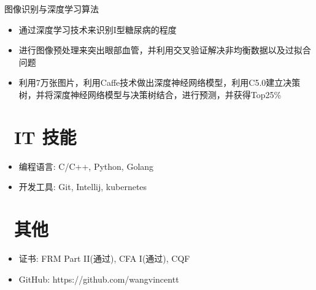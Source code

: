 \documentclass{resume}
\begin{document}
\begin{onehalfspacing}
图像识别与深度学习算法
\begin{itemize}
  \item 通过深度学习技术来识别I型糖尿病的程度
  \item 进行图像预处理来突出眼部血管，并利用交叉验证解决非均衡数据以及过拟合问题
  \item 利用7万张图片，利用Caffe技术做出深度神经网络模型，利用C5.0建立决策树，并将深度神经网络模型与决策树结合，进行预测，并获得Top25\%
\end{itemize}
\end{onehalfspacing}


\section{\faCogs\ IT 技能}
\begin{itemize}[parsep=0.5ex]
  \item 编程语言: C/C++, Python, Golang
  \item 开发工具: Git, Intellij, kubernetes
\end{itemize}

\section{\faInfo\ 其他}
\begin{itemize}[parsep=0.5ex]
  \item 证书: FRM Part II(通过), CFA I(通过), CQF
  \item GitHub: https://github.com/wangvincentt
\end{itemize}

%
%
\end{document}
